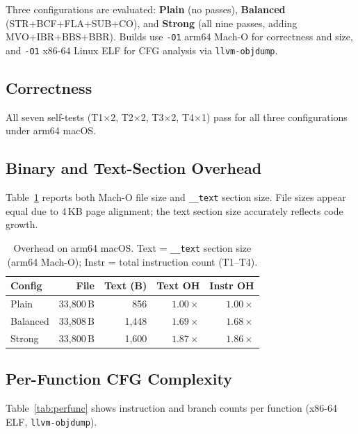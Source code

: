 \documentclass[conference]{IEEEtran}
\begin{document}
Three configurations are evaluated: \textbf{Plain} (no passes),
\textbf{Balanced} (STR+BCF+FLA+SUB+CO), and
\textbf{Strong} (all nine passes, adding MVO+IBR+BBS+BBR).
Builds use \texttt{-O1} arm64 Mach-O for correctness and size,
and \texttt{-O1} x86-64 Linux ELF for CFG analysis via
\texttt{llvm-objdump}.

\subsection{Correctness}

All seven self-tests (T1$\times$2, T2$\times$2, T3$\times$2,
T4$\times$1) pass for all three configurations under arm64 macOS.

\subsection{Binary and Text-Section Overhead}

Table~\ref{tab:overhead} reports both Mach-O file size and \texttt{\_\_text}
section size.
File sizes appear equal due to 4\,KB page alignment; the text section
size accurately reflects code growth.

\begin{table}[t]
\centering
\caption{Overhead on arm64 macOS. Text = \texttt{\_\_text} section
  size (arm64 Mach-O); Instr = total instruction count (T1--T4).}
\label{tab:overhead}
\footnotesize
\begin{tabular}{lrrrr}
\toprule
Config   & File & Text (B) & Text OH & Instr OH \\
\midrule
Plain    & 33{,}800\,B &  856 & $1.00\times$ & $1.00\times$ \\
Balanced & 33{,}808\,B & 1{,}448 & $1.69\times$ & $1.68\times$ \\
Strong   & 33{,}800\,B & 1{,}600 & $1.87\times$ & $1.86\times$ \\
\bottomrule
\end{tabular}
\end{table}

\subsection{Per-Function CFG Complexity}

Table~\ref{tab:perfunc} shows instruction and branch counts per
function (x86-64 ELF, \texttt{llvm-objdump}).
\end{document}
